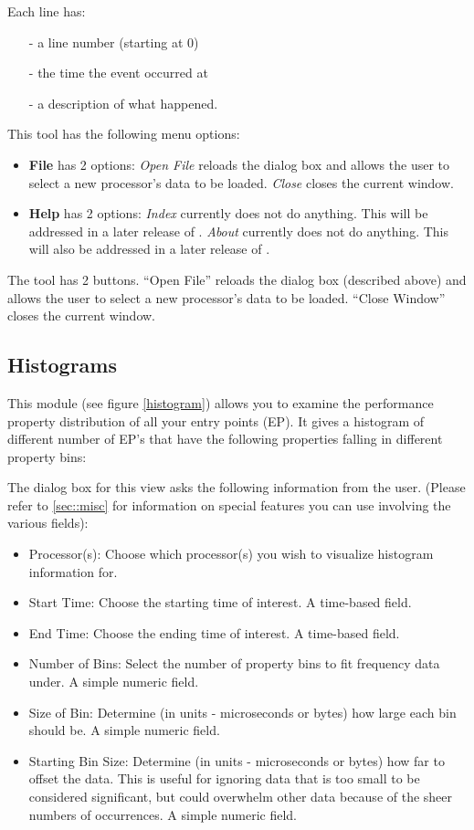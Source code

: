 \documentclass[10pt]{report}
\begin{document}
Each line has:
\begin{itemize}
\item[-] a line number (starting at 0)
\item[-] the time the event occurred at
\item[-] a description of what happened.
\end{itemize}

This tool has the following menu options:

\begin{itemize}
\item {\bf File} has 2 options: {\it Open File} reloads the dialog box
and allows the user to select a new processor's data to be loaded.
{\it Close} closes the current window.
\item {\bf Help} has 2 options: {\it Index} currently does not do anything.
This will be addressed in a later release of \projections{}. {\it About}
currently does not do anything. This will also be addressed in a later
release of \projections{}.
\end{itemize}

The tool has 2 buttons. ``Open File'' reloads the dialog box (described 
above) and allows the user to select a new processor's data to be loaded.
``Close Window'' closes the current window.

\subsection{Histograms}

This module (see figure \ref{histogram}) allows you to examine the
performance property distribution of all your entry points (EP). It
gives a histogram of different number of EP's that have the following
properties falling in different property bins:

The dialog box for this view asks the following information from the
user. (Please refer to \ref{sec::misc} for information on special
features you can use involving the various fields):

\begin{itemize}
\item
Processor(s): Choose which processor(s) you wish to visualize histogram
information for.
\item
Start Time: Choose the starting time of interest. A time-based field.
\item
End Time: Choose the ending time of interest. A time-based field.
\item
Number of Bins: Select the number of property bins to fit frequency data
under. A simple numeric field.
\item
Size of Bin: Determine (in units - microseconds or bytes) how large each
bin should be. A simple numeric field.
\item
Starting Bin Size: Determine (in units - microseconds or bytes) how
far to offset the data. This is useful for ignoring data that is too
small to be considered significant, but could overwhelm other data
because of the sheer numbers of occurrences. A simple numeric field.
\end{itemize}
\end{document}
